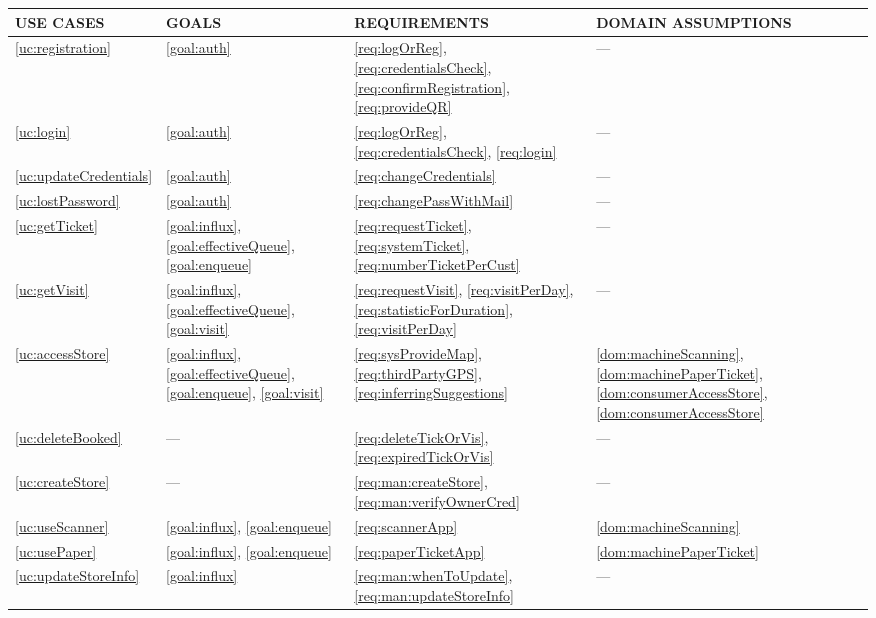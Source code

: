 \documentclass[a4paper, 10pt, oneside]{article}
\newcommand{\giovanni}[1]{\textcolor{Blue}{#1}}
\begin{document}
\begin{tabularx}{\linewidth}{| p{20mm} | p{20mm} | p{30mm} | p{50mm} |}

     \hline
	USE CASES & GOALS & REQUIREMENTS & DOMAIN ASSUMPTIONS \\
	 \hline
	\ref{uc:registration} & \giovanni{\ref{goal:auth}} & \ref{req:logOrReg}, \ref{req:credentialsCheck}, \ref{req:confirmRegistration}, \ref{req:provideQR}  & ---\\
	
	 \hline
	\ref{uc:login} & \ref{goal:auth} & \ref{req:logOrReg}, \ref{req:credentialsCheck}, \ref{req:login} & --- \\
	
	\hline
	\ref{uc:updateCredentials} & \ref{goal:auth} & \ref{req:changeCredentials} & --- \\

	\hline
	\ref{uc:lostPassword} & \ref{goal:auth} & \ref{req:changePassWithMail} & --- \\
	
	\hline
	\ref{uc:getTicket} & \ref{goal:influx}, \ref{goal:effectiveQueue}, \ref{goal:enqueue} & \ref{req:requestTicket}, \ref{req:systemTicket}, \ref{req:numberTicketPerCust} & --- \\
	\hline
	
	\ref{uc:getVisit} & \ref{goal:influx}, \ref{goal:effectiveQueue}, \ref{goal:visit} & \ref{req:requestVisit}, \ref{req:visitPerDay}, \ref{req:statisticForDuration}, \ref{req:visitPerDay} & --- \\
	\hline
	
	\ref{uc:accessStore} & \ref{goal:influx}, \ref{goal:effectiveQueue}, \ref{goal:enqueue}, \ref{goal:visit} & \ref{req:sysProvideMap}, \ref{req:thirdPartyGPS}, \ref{req:inferringSuggestions} & \ref{dom:machineScanning}, \ref{dom:machinePaperTicket}, \ref{dom:consumerAccessStore}, \ref{dom:consumerAccessStore} \\
	\hline
	
	\ref{uc:deleteBooked} & --- & \ref{req:deleteTickOrVis}, \ref{req:expiredTickOrVis} & --- \\
    \hline
    
    \ref{uc:createStore} & --- & \ref{req:man:createStore}, \ref{req:man:verifyOwnerCred} & --- \\
    \hline
    
    \ref{uc:useScanner} & \ref{goal:influx}, \ref{goal:enqueue} & \ref{req:scannerApp} & \ref{dom:machineScanning}\\
    \hline
    
    \ref{uc:usePaper} & \ref{goal:influx}, \ref{goal:enqueue} & \ref{req:paperTicketApp} & \ref{dom:machinePaperTicket}\\
    \hline
    
    \ref{uc:updateStoreInfo} & \ref{goal:influx} & \ref{req:man:whenToUpdate}, \ref{req:man:updateStoreInfo} & --- \\
    \hline
    
\end{tabularx}
\end{document}
